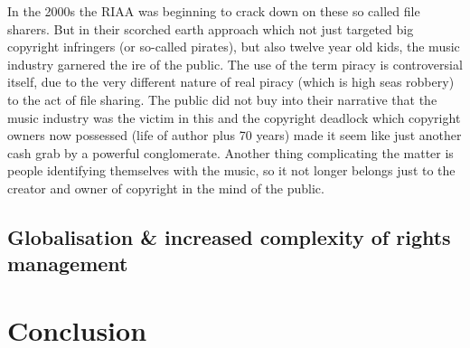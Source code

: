 \documentclass[a4paper]{report}
\begin{document}
In the 2000s the RIAA was beginning to crack down on these so called file sharers. But in their scorched earth approach which not just targeted big copyright infringers (or so-called pirates), but also twelve year old kids, the music industry garnered the ire of the public. The use of the term piracy is controversial itself, due to the very different nature of real piracy (which is high seas robbery) to the act of file sharing. The public did not buy into their narrative that the music industry was the victim in this and the copyright deadlock which copyright owners now possessed (life of author plus 70 years) made it seem like just another cash grab by a powerful conglomerate. Another thing complicating the matter is people identifying themselves with the music, so it not longer belongs just to the creator and owner of copyright in the mind of the public. \parencite{Lunceford2008}

\section{Globalisation \& increased complexity of rights management}
\label{sec:GlobalRightsMgmt}

\chapter{Conclusion}

\newpage

\printbibliography
\end{document}
